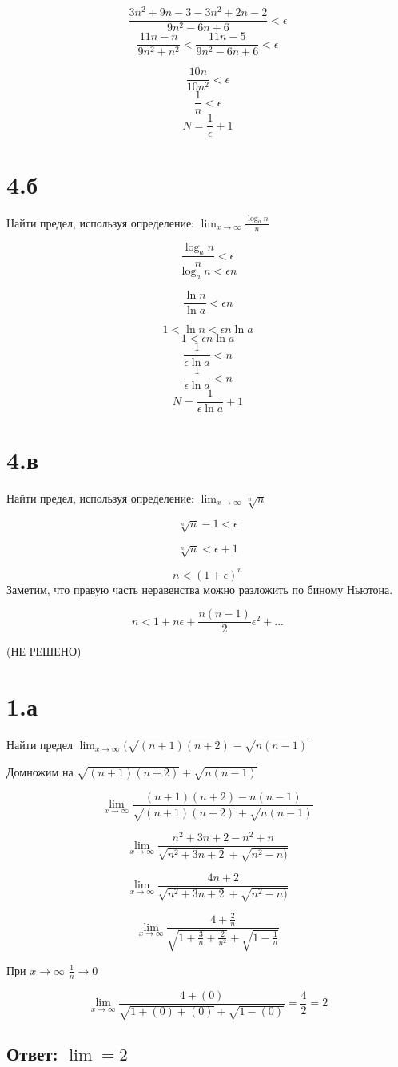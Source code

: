 \documentclass[a4paper]{article}
\begin{document}
$$\frac{3n^2 + 9n - 3 - 3n^2 + 2n - 2 }{9n^2 - 6n + 6} < \epsilon $$
$$\frac{ 11n - n}{9n^2 + n^2} < \frac{ 11n - 5}{9n^2 - 6n + 6} < \epsilon $$

$$\frac{ 10n}{10n^2} < \epsilon $$
$$\frac{ 1}{n} < \epsilon $$
$$N = \frac{ 1}{\epsilon} + 1 $$

\section{4.б}
Найти предел, используя определение: 
$\displaystyle{\lim_{x \to \infty}} \frac{\log_an}{n}$

$$\frac{\log_an}{n} < \epsilon $$
$$ \log_an < \epsilon n $$

$$ \frac{\ln n}{\ln a} < \epsilon n $$

$$ 1 < \ln n < \epsilon n \ln a $$
$$ 1 < \epsilon n \ln a $$
$$ \frac{1}{\epsilon \ln a} <  n  $$
$$ \frac{1}{\epsilon \ln a} <  n  $$
$$ N = \frac{1}{\epsilon \ln a} + 1  $$

\section{4.в}
Найти предел, используя определение: 
$\displaystyle{\lim_{x \to \infty}} \sqrt[n]{n}$

$$\sqrt[n]{n} - 1 < \epsilon$$

$$\sqrt[n]{n}  < \epsilon + 1$$ 

$$ n  < (1 + \epsilon ) ^ n$$ 
Заметим, что правую часть неравенства можно разложить по биному Ньютона.

$$ n  < 1 + n\epsilon + \frac{n(n-1)}{2}\epsilon^2 + ... $$ 

(НЕ РЕШЕНО)

\section{1.а}
Найти предел $ \displaystyle{\lim_{x \to \infty}}(\sqrt{(n+1)(n+2)} - \sqrt{n(n-1)} $

Домножим на $\sqrt{(n+1)(n+2)} + \sqrt{n(n-1)}$

$$ \displaystyle{\lim_{x \to \infty}}\frac{(n+1)(n+2) - n(n-1)}{\sqrt{(n+1)(n+2)} + \sqrt{n(n-1)}} $$

$$ \displaystyle{\lim_{x \to \infty}}\frac{ n^2 + 3n + 2 - n^2 + n}{\sqrt{n^2 + 3n + 2} + \sqrt{n^2-n)}} $$

$$ \displaystyle{\lim_{x \to \infty}}\frac{ 4n + 2 }{\sqrt{n^2 + 3n + 2} + \sqrt{n^2-n)}} $$

$$ \displaystyle{\lim_{x \to \infty}}\frac{ 4 + \frac{2}{n} }{\sqrt{1 + \frac{3}{n} + \frac{2}{n^2}} + \sqrt{1-\frac{1}{n}}} $$

При $x \to \infty$ $\frac{1}{n} \to 0$

$$ \displaystyle{\lim_{x \to \infty}}\frac{ 4 + (0) }{\sqrt{1 + (0) + (0)} + \sqrt{1-(0)}} = \frac{4}{2} = 2 $$

\subsection*{Ответ: $\lim = 2$}
\end{document}
